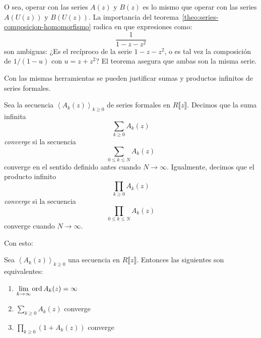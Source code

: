   O sea,
  operar con las series \(A(z)\) y \(B(z)\)
  es lo mismo que operar con las series \(A(U(z))\) y \(B(U(z))\).
  La importancia del teorema~\ref{theo:series-composicion-homomorfismo}
  radica en que expresiones como:
  \begin{equation*}
    \frac{1}{1 - z - z^2}
  \end{equation*}
  son ambiguas:
  ¿Es el recíproco de la serie \(1 - z - z^2\),
  o es tal vez la composición de \(1 / (1 - u)\) con \(u = z + z^2\)?
  El teorema asegura que ambas son la misma serie.

  Con las mismas herramientas se pueden justificar sumas y productos infinitos
  de series formales.
  \begin{definition}
    Sea la secuencia \(\left\langle A_k(z) \right\rangle_{k \ge 0}\)
    de series formales en \(R \llbracket z \rrbracket\).
    Decimos que la suma infinita
    \begin{equation*}
      \sum_{k \ge 0} A_k(z)
    \end{equation*}
    \emph{converge} si la secuencia
    \begin{equation*}
      \sum_{0 \le k \le N} A_k(z)
    \end{equation*}
    converge en el sentido definido antes cuando \(N \rightarrow \infty\).
    Igualmente,
    decimos que el producto infinito
    \begin{equation*}
      \prod_{k \ge 0} A_k(z)
    \end{equation*}
    \emph{converge} si la secuencia
    \begin{equation*}
      \prod_{0 \le k \le N} A_k(z)
    \end{equation*}
    converge cuando \(N \rightarrow \infty\).
  \end{definition}
  Con esto:
  \begin{theorem}
    \label{theo:formal-series-convergence:sum+product}
    Sea \(\left\langle A_k(z) \right\rangle_{k \ge 0}\)
    una secuencia en \(R \llbracket z \rrbracket\).
    Entonces las siguientes son equivalentes:
    \begin{enumerate}
    \item\label{item:lfs:infty}
      \(\displaystyle \lim_{k \rightarrow \infty} \operatorname{ord} A_k(z) = \infty\)
    \item\label{item:lfs:sum}
      \(\displaystyle \sum_{k \ge 0} A_k(z)\) converge
    \item\label{item:lfs:prod}
      \(\displaystyle \prod_{k \ge 0} (1 + A_k(z))\) converge
    \end{enumerate}
  \end{theorem}
